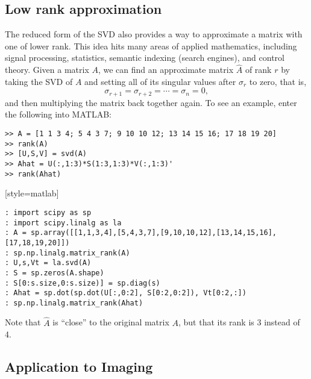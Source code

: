 \subsection{Low rank approximation}

The reduced form of the SVD also provides a way to approximate a
matrix with one of lower rank. This idea hits many areas of applied
mathematics, including signal processing, statistics, semantic
indexing (search engines), and control theory.  Given a matrix $A$,
we can find an approximate matrix $\widehat A$ of rank $r$ by taking
the SVD of $A$ and setting all of its singular values after
$\sigma_r$ to zero, that is,
\[
\sigma_{r+1} = \sigma_{r+2} = \cdots = \sigma_n = 0,
\]
and then multiplying the matrix back together again.  To see an
example, enter the following into MATLAB:

\begin{matlab}
 \begin{lstlisting}[style=matlab]
>> A = [1 1 3 4; 5 4 3 7; 9 10 10 12; 13 14 15 16; 17 18 19 20]
>> rank(A)
>> [U,S,V] = svd(A)
>> Ahat = U(:,1:3)*S(1:3,1:3)*V(:,1:3)'
>> rank(Ahat)
\end{lstlisting}[style=matlab]
\end{matlab}
\begin{python}
\begin{lstlisting}[style=python]
: import scipy as sp
: import scipy.linalg as la
: A = sp.array([[1,1,3,4],[5,4,3,7],[9,10,10,12],[13,14,15,16],[17,18,19,20]])
: sp.np.linalg.matrix_rank(A)
: U,s,Vt = la.svd(A)
: S = sp.zeros(A.shape)
: S[0:s.size,0:s.size)] = sp.diag(s)
: Ahat = sp.dot(sp.dot(U[:,0:2], S[0:2,0:2]), Vt[0:2,:])
: sp.np.linalg.matrix_rank(Ahat)
\end{lstlisting}
\end{python}
Note that $\widehat A$ is ``close'' to the original matrix $A$, but
that its rank is 3 instead of 4.

\subsection{Application to Imaging}

